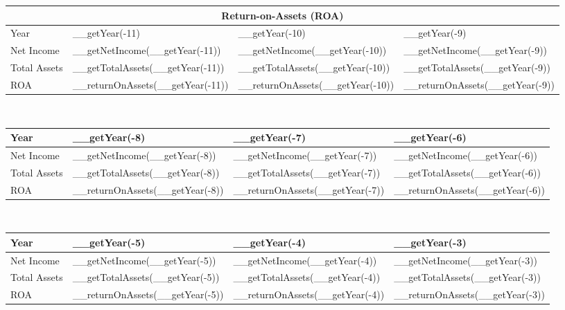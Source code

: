 \begin{tabularx}{\textwidth}{|X|X|X|X|}
 \hline
 \multicolumn{4}{|c|}{Return-on-Assets (ROA)} \\
 \hline
 Year                     & __getYear(-11)                   & __getYear(-10)                   & __getYear(-9)                   \\
 \hline
 Net Income               & __getNetIncome(__getYear(-11))   & __getNetIncome(__getYear(-10))   & __getNetIncome(__getYear(-9))   \\
 Total Assets             & __getTotalAssets(__getYear(-11)) & __getTotalAssets(__getYear(-10)) & __getTotalAssets(__getYear(-9)) \\
 \rowcolor{lightgray} ROA & __returnOnAssets(__getYear(-11)) & __returnOnAssets(__getYear(-10)) & __returnOnAssets(__getYear(-9)) \\
 \hline
\end{tabularx}\\

\begin{tabularx}{\textwidth}{|X|X|X|X|}
 \hline
 Year                     & __getYear(-8)                   & __getYear(-7)                   & __getYear(-6)                   \\
 \hline
 Net Income               & __getNetIncome(__getYear(-8))   & __getNetIncome(__getYear(-7))   & __getNetIncome(__getYear(-6))   \\
 Total Assets             & __getTotalAssets(__getYear(-8)) & __getTotalAssets(__getYear(-7)) & __getTotalAssets(__getYear(-6)) \\
 \rowcolor{lightgray} ROA & __returnOnAssets(__getYear(-8)) & __returnOnAssets(__getYear(-7)) & __returnOnAssets(__getYear(-6)) \\
 \hline
\end{tabularx}\\

\begin{tabularx}{\textwidth}{|X|X|X|X|}
 \hline
 Year                     & __getYear(-5)                   & __getYear(-4)                   & __getYear(-3)                   \\
 \hline
 Net Income               & __getNetIncome(__getYear(-5))   & __getNetIncome(__getYear(-4))   & __getNetIncome(__getYear(-3))   \\
 Total Assets             & __getTotalAssets(__getYear(-5)) & __getTotalAssets(__getYear(-4)) & __getTotalAssets(__getYear(-3)) \\
 \rowcolor{lightgray} ROA & __returnOnAssets(__getYear(-5)) & __returnOnAssets(__getYear(-4)) & __returnOnAssets(__getYear(-3)) \\
 \hline
\end{tabularx}\\

